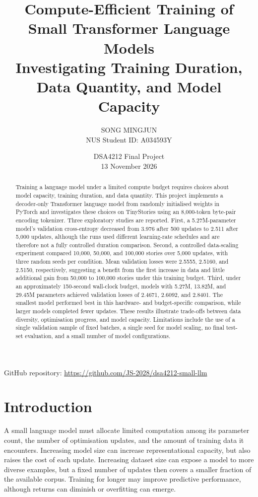 \documentclass[10pt,a4paper]{article}
\title{\textbf{Compute-Efficient Training of Small Transformer Language Models}\\
\large Investigating Training Duration, Data Quantity, and Model Capacity}
\author{SONG MINGJUN\\NUS Student ID: A034593Y}
\date{DSA4212 Final Project\\13 November 2026}
\begin{document}
\maketitle
\begin{center}
\small GitHub repository: \url{https://github.com/JS-2028/dsa4212-small-llm}
\end{center}

\begin{abstract}
Training a language model under a limited compute budget requires choices about model capacity, training duration, and data quantity. This project implements a decoder-only Transformer language model from randomly initialised weights in PyTorch and investigates these choices on TinyStories using an 8,000-token byte-pair encoding tokenizer. Three exploratory studies are reported. First, a 5.27M-parameter model's validation cross-entropy decreased from 3.976 after 500 updates to 2.511 after 5,000 updates, although the runs used different learning-rate schedules and are therefore not a fully controlled duration comparison. Second, a controlled data-scaling experiment compared 10,000, 50,000, and 100,000 stories over 5,000 updates, with three random seeds per condition. Mean validation losses were 2.5555, 2.5160, and 2.5150, respectively, suggesting a benefit from the first increase in data and little additional gain from 50,000 to 100,000 stories under this training budget. Third, under an approximately 150-second wall-clock budget, models with 5.27M, 13.82M, and 29.45M parameters achieved validation losses of 2.4671, 2.6092, and 2.8401. The smallest model performed best in this hardware- and budget-specific comparison, while larger models completed fewer updates. These results illustrate trade-offs between data diversity, optimisation progress, and model capacity. Limitations include the use of a single validation sample of fixed batches, a single seed for model scaling, no final test-set evaluation, and a small number of model configurations.
\end{abstract}

\section{Introduction}
A small language model must allocate limited computation among its parameter count, the number of optimisation updates, and the amount of training data it encounters. Increasing model size can increase representational capacity, but also raises the cost of each update. Increasing dataset size can expose a model to more diverse examples, but a fixed number of updates then covers a smaller fraction of the available corpus. Training for longer may improve predictive performance, although returns can diminish or overfitting can emerge.
\end{document}

